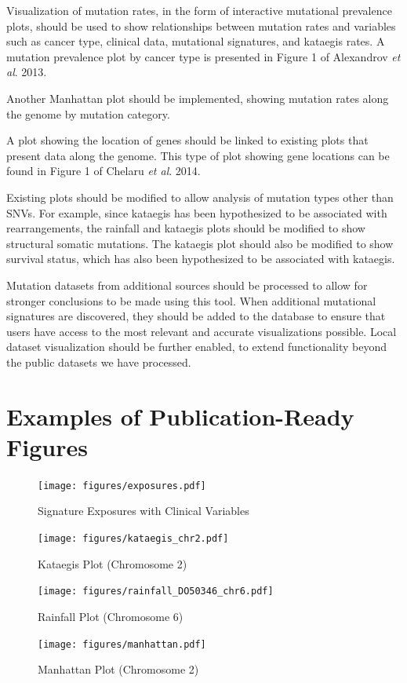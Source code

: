 \documentclass[12pt, letterpaper]{article}
\begin{document}
Visualization of mutation rates, in the form of interactive mutational prevalence plots, should be used to show relationships between mutation rates and variables such as cancer type, clinical data, mutational signatures, and kataegis rates.
A mutation prevalence plot by cancer type is presented in Figure 1 of Alexandrov \textit{et al}. 2013\cite{alexandrov2013signatures}.

Another Manhattan plot should be implemented, showing mutation rates along the genome by mutation category.

A plot showing the location of genes should be linked to existing plots that present data along the genome.
This type of plot showing gene locations can be found in Figure 1 of Chelaru \textit{et al}. 2014\cite{chelaru2014epiviz}.

Existing plots should be modified to allow analysis of mutation types other than SNVs. 
For example, since kataegis has been hypothesized to be associated with rearrangements, the rainfall and kataegis plots should be modified to show structural somatic mutations. The kataegis plot should also be modified to show survival status, which has also been hypothesized to be associated with kataegis.

Mutation datasets from additional sources should be processed to allow for stronger conclusions to be made using this tool.
When additional mutational signatures are discovered, they should be added to the database to ensure that users have access to the most relevant and accurate visualizations possible.
Local dataset visualization should be further enabled, to extend functionality beyond the public datasets we have processed.


{}


\pagebreak
\appendix                                     
\section{Examples of Publication-Ready Figures}
\renewcommand{\figurename}{Example Figure}
\setcounter{figure}{0}

\begin{figure}[h!]
    \caption{Signature Exposures with Clinical Variables}
    \centering
    \texttt{[image: figures/exposures.pdf]}
\end{figure}
\begin{figure}[h!]
    \caption{Kataegis Plot (Chromosome 2)}
    \centering
    \texttt{[image: figures/kataegis\_chr2.pdf]}
\end{figure}
\begin{figure}[h!]
    \caption{Rainfall Plot (Chromosome 6)}
    \centering
    \texttt{[image: figures/rainfall\_DO50346\_chr6.pdf]}
\end{figure}
\begin{figure}[h!]
    \caption{Manhattan Plot (Chromosome 2)}
    \centering
    \texttt{[image: figures/manhattan.pdf]}
\end{figure}
\end{document}
